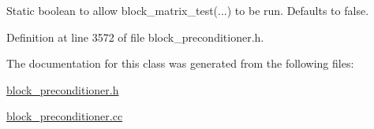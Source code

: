 Static boolean to allow block\+\_\+matrix\+\_\+test(...) to be run. Defaults to false. 



Definition at line 3572 of file block\+\_\+preconditioner.\+h.



The documentation for this class was generated from the following files\+:\begin{DoxyCompactItemize}
\item 
\hyperlink{block__preconditioner_8h}{block\+\_\+preconditioner.\+h}\item 
\hyperlink{block__preconditioner_8cc}{block\+\_\+preconditioner.\+cc}\end{DoxyCompactItemize}

